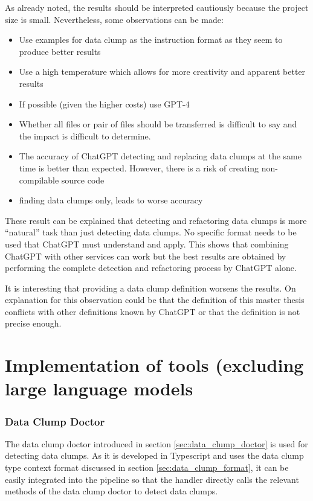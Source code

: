 As already noted, the results should be interpreted cautiously because the project size is small. Nevertheless, some observations can be made:

\begin{itemize}
    \item Use examples for data clump as the instruction format as they seem to produce better results
    \item Use a high temperature which allows for more creativity and apparent better results
    \item If possible (given the higher costs) use GPT-4
    \item Whether all files or pair of files should be transferred is difficult to say and the impact is difficult to determine. 
    \item The accuracy of ChatGPT detecting and replacing data clumps at the same time is better than expected. However, there is a risk of creating non-compilable source code
    \item finding data clumps only, leads to worse accuracy
\end{itemize}
These result can be explained that detecting and refactoring data clumps is more \enquote{natural} task than just detecting data clumps. No specific format needs to be used that ChatGPT must understand and apply. This shows that combining ChatGPT with other services can work but the best results are obtained by performing the complete detection and refactoring process by ChatGPT alone. 

It is interesting that providing a data clump definition worsens the results. On explanation for this observation could be that the definition of this master thesis conflicts with other definitions known by ChatGPT or that the definition is not precise enough.

\section{Implementation of tools (excluding large language models} \label{sec:step_impl}

\subsubsection{Data Clump Doctor}

The data clump doctor introduced in section \ref{sec:data_clump_doctor} is used for detecting data clumps. As it is developed in Typescript and uses the data clump type context format discussed in section \ref{sec:data_clump_format}, it can be easily integrated into the pipeline so that the handler directly calls the relevant methods of the data clump doctor to detect data clumps. 


